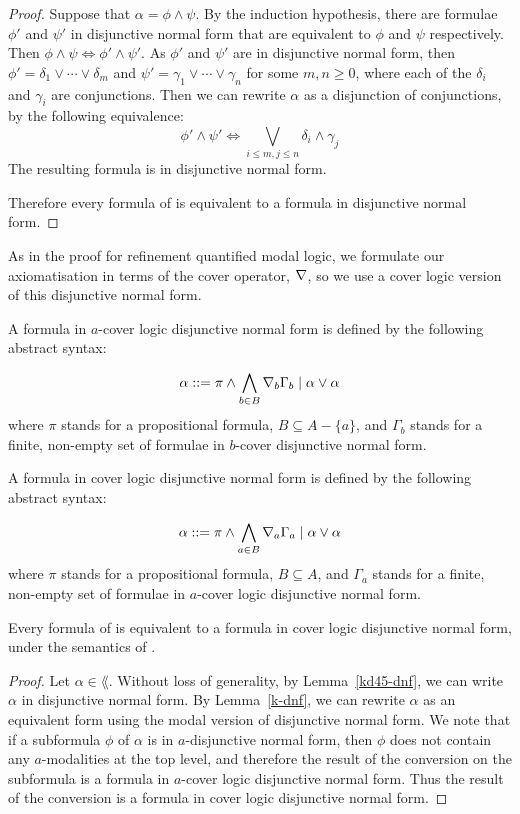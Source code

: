 \begin{proof}
Suppose that $\alpha = \phi \land \psi$. By the induction hypothesis, there are
formulae $\phi'$ and $\psi'$ in disjunctive normal form that are equivalent to
$\phi$ and $\psi$ respectively. Then $\phi \land \psi \iff \phi' \land \psi'$.
As $\phi'$ and $\psi'$ are in disjunctive normal form, then $\phi' = \delta_1
\lor \cdots \lor \delta_m$ and $\psi' = \gamma_1 \lor \cdots \lor \gamma_n$ for
some $m, n \geq 0$, where each of the $\delta_i$ and $\gamma_i$ are
conjunctions. Then we can rewrite $\alpha$ as a disjunction of conjunctions, by
the following equivalence:
$$
\phi' \land \psi' \iff \bigvee_{i \leq m, j \leq n} \delta_i \land \gamma_j
$$
The resulting formula is in disjunctive normal form.

Therefore every formula of \lang{} is equivalent to a formula in disjunctive
normal form.
\end{proof}

As in the proof for refinement quantified modal logic, we formulate our
axiomatisation in terms of the cover operator, $\nabla$, so we use a cover
logic version of this disjunctive normal form.

\begin{definition}\label{kd45-cdnf}
A formula in $a$-cover logic disjunctive normal form is defined by the following
abstract syntax:

$$
\alpha ::= \pi \land \bigwedge_{b \in B} \nabla_b \Gamma_b \mid
\alpha \lor \alpha
$$
where $\pi$ stands for a propositional formula, $B \subseteq A - \{a\}$, and
$\Gamma_b$ stands for a finite, non-empty set of formulae in $b$-cover
disjunctive normal form.

A formula in cover logic disjunctive normal form is defined by the following abstract
syntax:

$$
\alpha ::= \pi \land \bigwedge_{a \in B} \nabla_a \Gamma_a \mid
\alpha \lor \alpha
$$
where $\pi$ stands for a propositional formula, $B \subseteq A$, and $\Gamma_a$
stands for a finite, non-empty set of formulae in $a$-cover logic disjunctive normal
form.
\end{definition}

\begin{lemma}\label{kd45-cdnf}
Every formula of \lang{} is equivalent to a formula in cover logic disjunctive normal
form, under the semantics of \logicKD{}.
\end{lemma}

\begin{proof}
Let $\alpha \in \lang$. Without loss of generality, by Lemma~\ref{kd45-dnf}, we
can write $\alpha$ in disjunctive normal form. By Lemma~\ref{k-dnf}, we can
rewrite $\alpha$ as an equivalent form using the modal version of disjunctive
normal form. We note that if a subformula $\phi$ of $\alpha$ is in
$a$-disjunctive normal form, then $\phi$ does not contain any $a$-modalities at
the top level, and therefore the result of the conversion on the subformula is
a formula in $a$-cover logic disjunctive normal form. Thus the result of the
conversion is a formula in cover logic disjunctive normal form.
\end{proof}


